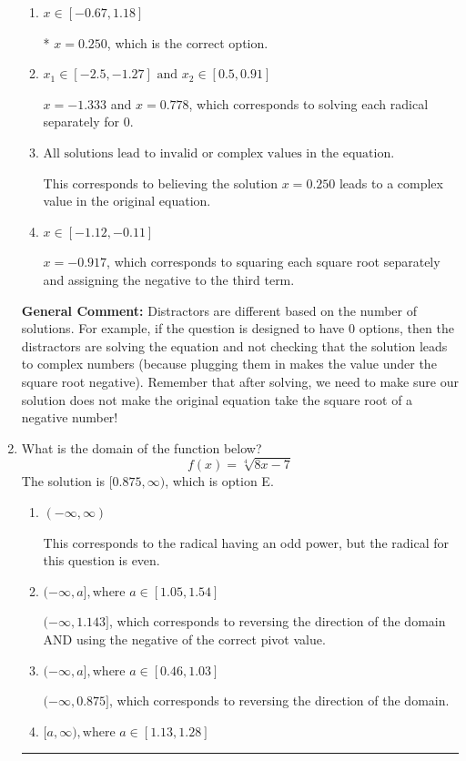 \documentclass{extbook}[14pt]
\newcommand{\litem}[1]{\item #1

\rule{\textwidth}{0.4pt}}
\begin{document}
\begin{enumerate}
{\begin{enumerate}[label=\Alph*.]
$x = -1.333$ and $x = 0.250$, which corresponds to solving the equation correctly and including the value that makes the first square root 0.
\item \( x \in [-0.67,1.18] \)

* $x = 0.250$, which is the correct option.
\item \( x_1 \in [-2.5, -1.27] \text{ and } x_2 \in [0.5,0.91] \)

$x = -1.333$ and $x = 0.778$, which corresponds to solving each radical separately for 0.
\item \( \text{All solutions lead to invalid or complex values in the equation.} \)

This corresponds to believing the solution $x = 0.250$ leads to a complex value in the original equation.
\item \( x \in [-1.12,-0.11] \)

$x = -0.917$, which corresponds to squaring each square root separately and assigning the negative to the third term.
\end{enumerate}

\textbf{General Comment:} Distractors are different based on the number of solutions. For example, if the question is designed to have 0 options, then the distractors are solving the equation and not checking that the solution leads to complex numbers (because plugging them in makes the value under the square root negative). Remember that after solving, we need to make sure our solution does not make the original equation take the square root of a negative number!
}
\litem{
What is the domain of the function below?
\[ f(x) = \sqrt[4]{8 x - 7} \]The solution is \( [0.875, \infty) \), which is option E.\begin{enumerate}[label=\Alph*.]
\item \( (-\infty, \infty) \)

This corresponds to the radical having an odd power, but the radical for this question is even.
\item \( (-\infty, a], \text{where } a \in [1.05, 1.54] \)

$(-\infty, 1.143]$, which corresponds to reversing the direction of the domain AND using the negative of the correct pivot value.
\item \( (-\infty, a], \text{where } a \in [0.46, 1.03] \)

 $(-\infty, 0.875]$, which corresponds to reversing the direction of the domain.
\item \( [a, \infty), \text{where } a \in [1.13, 1.28] \)


\end{enumerate}}
\end{enumerate}
\end{document}

